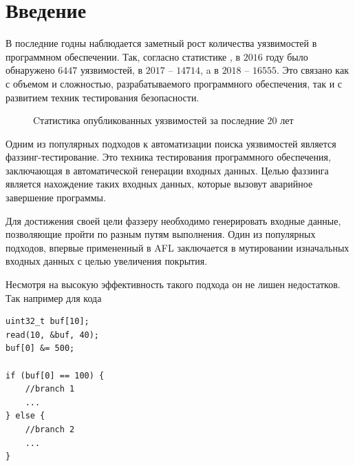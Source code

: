 \chapter{Введение}


В последние годны наблюдается заметный рост количества уязвимостей в программном обеспечении. Так, согласно статистике \cite{CVEstats}, в $2016$ году было обнаружено $6447$ уязвимостей, в $2017$ --  $14714$, a в $2018$ -- $16555$. Это связано как с объемом и сложностью, разрабатываемого программного обеспечения, так и с развитием техник тестирования безопасности.

\begin{figure}[h]
    \caption{Cтатистика опубликованных уязвимостей за последние 20 лет}
    \label{fig:image}
\end{figure}

Одним из популярных подходов к автоматизации поиска уязвимостей является фаззинг-тестирование. Это
техника тестирования программного обеспечения, заключающая в автоматической генерации входных данных. Целью фаззинга является нахождение таких входных данных, которые вызовут аварийное завершение программы.

Для достижения своей цели фаззеру необходимо генерировать входные данные, позволяющие пройти по разным путям выполнения. Один из популярных подходов, впервые примененный в AFL \cite{AFL} заключается в мутировании изначальных входных данных с целью увеличения покрытия.

Несмотря на высокую эффективность такого подхода он не лишен недостатков. Так например для кода
\begin{lstlisting}[environoment=C_LANG, label=example1]
uint32_t buf[10];
read(10, &buf, 40);
buf[0] &= 500;

if (buf[0] == 100) {
    //branch 1
    ...
} else {
    //branch 2
    ...
}
\end{lstlisting}

